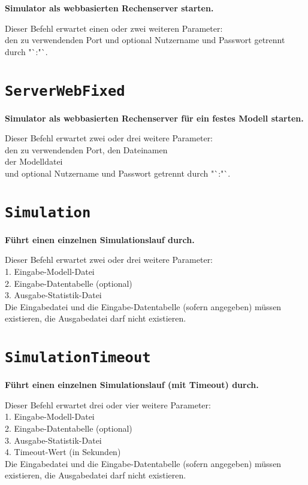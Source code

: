 \textbf{Simulator als webbasierten Rechenserver starten.}

Dieser Befehl erwartet einen oder zwei weiteren Parameter:\\
den zu verwendenden Port und optional Nutzername und Passwort getrennt durch "`:"`.

\section{\texttt{ServerWebFixed}}

\textbf{Simulator als webbasierten Rechenserver für ein festes Modell starten.}

Dieser Befehl erwartet zwei oder drei weitere Parameter:\\
den zu verwendenden Port, den Dateinamen\\
der Modelldatei\\
und optional Nutzername und Passwort getrennt durch "`:"`.

\section{\texttt{Simulation}}

\textbf{Führt einen einzelnen Simulationslauf durch.}

Dieser Befehl erwartet zwei oder drei weitere Parameter:\\
1. Eingabe-Modell-Datei\\
2. Eingabe-Datentabelle (optional)\\
3. Ausgabe-Statistik-Datei\\
Die Eingabedatei und die Eingabe-Datentabelle (sofern angegeben) müssen existieren, die Ausgabedatei darf nicht existieren.

\section{\texttt{SimulationTimeout}}

\textbf{Führt einen einzelnen Simulationslauf (mit Timeout) durch.}

Dieser Befehl erwartet drei oder vier weitere Parameter:\\
1. Eingabe-Modell-Datei\\
2. Eingabe-Datentabelle (optional)\\
3. Ausgabe-Statistik-Datei\\
4. Timeout-Wert (in Sekunden)\\
Die Eingabedatei und die Eingabe-Datentabelle (sofern angegeben) müssen existieren, die Ausgabedatei darf nicht existieren.

